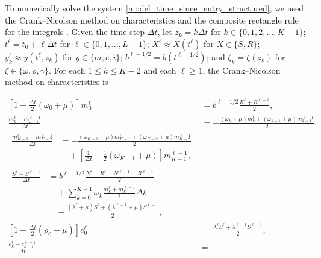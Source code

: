 \documentclass{jpmarticle}
\let\subequationsorig\subequations%
\let\endsubequationsorig\endsubequations%
\renewenvironment{subequations}{
  \subequationsorig
  \renewcommand{\theequation}{\theparentequation.\arabic{equation}}
}{
  \endsubequationsorig
}
\begin{document}
To numerically solve the system
\eqref{model_time_since_entry_structured}, we used the Crank--Nicolson
method on characteristics and the composite rectangle rule for the
integrals \autocite{milner_1992}.  Given the time step $\Delta t$,
let $z_k = k \Delta t$
for $k \in \{0, 1, 2, \ldots, K - 1\}$;
$t^{\ell} = t_0 + \ell \Delta t$
for $\ell \in \{0, 1, \ldots, L - 1\}$;
$X^{\ell} \approx X(t^{\ell})$
for $X \in \{S, R\}$;
$y_k^{\ell} \approx y(t^{\ell}, z_k)$
for $y \in \{m, e, i\}$;
$b^{\ell - 1 / 2} = b(t^{\ell - 1 / 2})$;
and $\zeta_k = \zeta(z_k)$
for $\zeta \in \{\omega, \rho, \gamma\}$.
For each $1 \leq k \leq K - 2$
and each $\ell \geq 1$,
the Crank--Nicolson method on characteristics is
\begin{subequations}
  \label{numerics_time_since_entry_structured}
  \begin{align}
    \left[1 + \frac{\Delta t}{2} (\omega_0 + \mu)\right] m_0^{\ell}
    &= b^{\ell - 1 / 2} \frac{R^{\ell} + R^{\ell - 1}}{2},
    \\
    \frac{m_k^{\ell} - m_{k - 1}^{\ell - 1}}{\Delta t} &=
    - \frac{(\omega_k + \mu) m_k^{\ell}
      + (\omega_{k - 1} + \mu) m_{k - 1}^{\ell - 1}}{2},
    \\
    \begin{split}
      \frac{m_{K - 1}^{\ell} - m_{K - 2}^{\ell - 1}}{\Delta t} &=
      - \frac{(\omega_{K - 1} + \mu) m_{K - 1}^{\ell}
        + (\omega_{K - 2} + \mu) m_{K - 2}^{\ell - 1}}{2}
      \\ & \quad {}
      + \left[
        \frac{1}{\Delta t} - \frac{1}{2} (\omega_{K - 1} + \mu)
      \right] m_{K - 1}^{\ell - 1},
    \end{split}
    \\
    \begin{split}
      \frac{S^{\ell} - S^{\ell - 1}}{\Delta t} &=
      b^{\ell - 1 / 2}
      \frac{N^{\ell} - R^{\ell} + N^{\ell - 1} - R^{\ell - 1}}{2}
      \\ & \quad {}
      + \sum_{k = 0}^{K - 1} \omega_k
      \frac{m_k^{\ell} + m_k^{\ell - 1}}{2}
      \Delta t
      \\ & \quad {}
      - \frac{(\lambda^{\ell} + \mu) S^{\ell}
        + (\lambda^{\ell - 1} + \mu) S^{\ell - 1}}{2},
    \end{split}
    \\
    \left[1 + \frac{\Delta t}{2} (\rho_0 + \mu)\right] e_0^{\ell}
    &= \frac{\lambda^{\ell} S^{\ell} + \lambda^{\ell - 1} S^{\ell - 1}}{2},
    \\
    \frac{e_k^{\ell} - e_{k - 1}^{\ell - 1}}{\Delta t} &=

\end{align}
\end{subequations}
\end{document}
